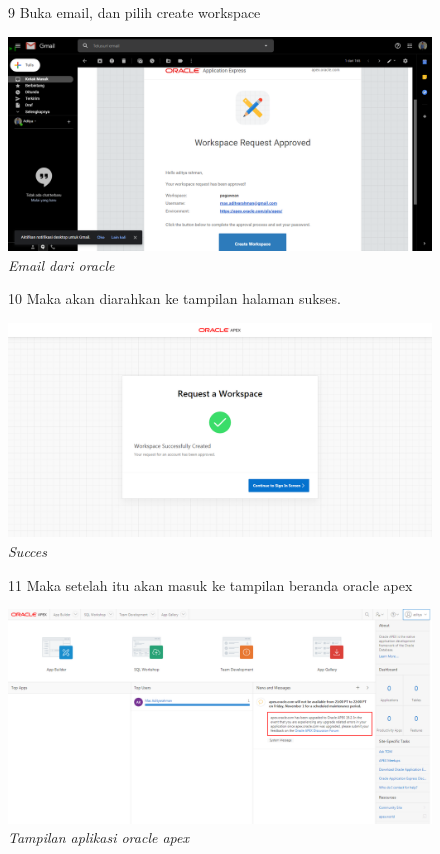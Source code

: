 \begin{enumerate}
\begin{figure}[!htbp]
\item[9] Buka email, dan pilih create workspace
	\begin{center}
	\includegraphics[scale=0.2]{figures/tahap8.png}
	\caption{\textit{Email dari oracle}}
	\end{center}	 
\end{figure}

\begin{figure}[!htbp]
\item[10] Maka akan diarahkan ke tampilan halaman sukses.
	\begin{center}
	\includegraphics[scale=0.2]{figures/tahap9.png}
	\caption{\textit{Succes}}
	\end{center}	 
\end{figure}

\begin{figure}[!htbp]
\item[11] Maka setelah itu akan masuk ke tampilan beranda oracle apex
	\begin{center}
	\includegraphics[scale=0.2]{figures/tahap10.png}
	\caption{\textit{Tampilan aplikasi oracle apex}}
	\end{center}	 
\end{figure}


\end{enumerate}
